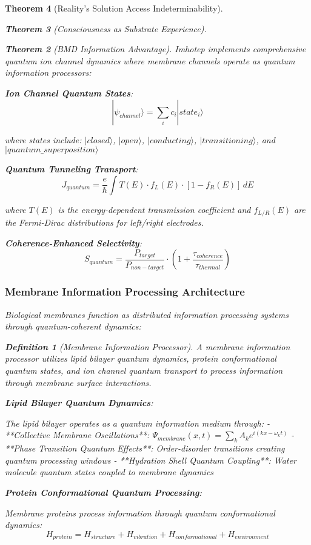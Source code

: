 \documentclass[12pt,a4paper]{article}
\newtheorem{theorem}{Theorem}[section]
\newtheorem{definition}[theorem]{Definition}
\theoremstyle{remark}
\begin{document}
\begin{theorem}[Reality's Solution Access Indeterminability]
\begin{theorem}[Consciousness as Substrate Experience]
\begin{theorem}[BMD Information Advantage]
Imhotep implements comprehensive quantum ion channel dynamics where membrane channels operate as quantum information processors:

\textbf{Ion Channel Quantum States}:
$$|\psi_{channel}\rangle = \sum_{i} c_i |state_i\rangle$$

where states include: $|closed\rangle$, $|open\rangle$, $|conducting\rangle$, $|transitioning\rangle$, and $|quantum\_superposition\rangle$

\textbf{Quantum Tunneling Transport}:
$$J_{quantum} = \frac{e}{\hbar} \int T(E) \cdot f_L(E) \cdot [1 - f_R(E)] \, dE$$

where $T(E)$ is the energy-dependent transmission coefficient and $f_{L/R}(E)$ are the Fermi-Dirac distributions for left/right electrodes.

\textbf{Coherence-Enhanced Selectivity}:
$$S_{quantum} = \frac{P_{target}}{P_{non-target}} \cdot \left(1 + \frac{\tau_{coherence}}{\tau_{thermal}}\right)$$

\subsubsection{Membrane Information Processing Architecture}

Biological membranes function as distributed information processing systems through quantum-coherent dynamics:

\begin{definition}[Membrane Information Processor]
A membrane information processor utilizes lipid bilayer quantum dynamics, protein conformational quantum states, and ion channel quantum transport to process information through membrane surface interactions.
\end{definition}

\textbf{Lipid Bilayer Quantum Dynamics}:

The lipid bilayer operates as a quantum information medium through:
- **Collective Membrane Oscillations**: $\Psi_{membrane}(x,t) = \sum_k A_k e^{i(kx - \omega_k t)}$
- **Phase Transition Quantum Effects**: Order-disorder transitions creating quantum processing windows
- **Hydration Shell Quantum Coupling**: Water molecule quantum states coupled to membrane dynamics

\textbf{Protein Conformational Quantum Processing}:

Membrane proteins process information through quantum conformational dynamics:
$$H_{protein} = H_{structure} + H_{vibration} + H_{conformational} + H_{environment}$$


\end{theorem}
\end{theorem}
\end{theorem}
\end{document}
